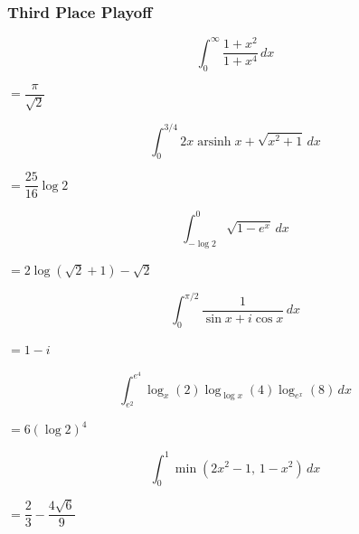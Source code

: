 \subsubsection*{Third Place Playoff}
\begin{questions}

\question \[ \int_0^\infty \frac{1+x^2}{1+x^4}\, dx \]
\begin{solution} $= \dfrac{\pi}{\sqrt{2}}$ \end{solution}

\question \[ \int_0^{3/4} 2x\operatorname{arsinh}x + \sqrt{x^2+1}\, dx \]
\begin{solution} $= \dfrac{25}{16}\log 2$ \end{solution}

\question \[ \int_{-\log 2}^0 \sqrt{1-e^x}\, dx \]
\begin{solution} $= 2\log\left(\sqrt2+1\right) - \sqrt2$ \end{solution}

\question \[ \int_0^{\pi/2} \frac{1}{\sin x+i\cos x}\, dx \]
\begin{solution} $= 1-i$ \end{solution}

\question[Tiebreaker 1] \[ \int_{e^2}^{e^4} \log_x(2)\log_{\log x}(4)\log_{e^x}(8)\, dx \]
\begin{solution} $= 6(\log 2)^4$ \end{solution}

\question[Tiebreaker 2] \[ \int_0^1 \min(2x^2-1,\,1-x^2)\, dx \]
\begin{solution} $= \dfrac{2}{3}-\dfrac{4\sqrt6}{9}$ \end{solution}

\end{questions}

